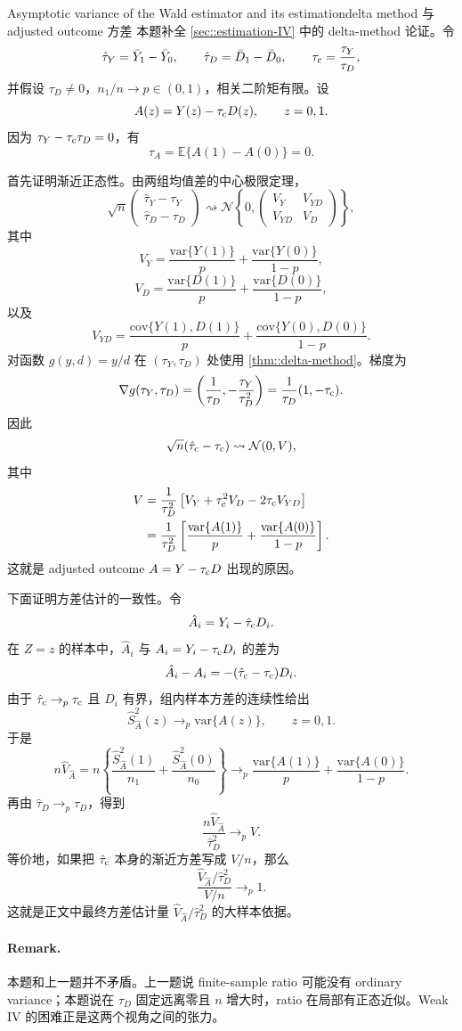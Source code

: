 \begin{exercisesolution}{Asymptotic variance of the Wald estimator and its estimation}{delta method 与 adjusted outcome 方差}
本题补全 \cref{sec::estimation-IV} 中的 delta-method 论证。令
\[
\hat{\tau}_Y=\bar{Y}_1-\bar{Y}_0,\qquad
\hat{\tau}_D=\bar{D}_1-\bar{D}_0,\qquad
\tau_{\textup{c}}=\frac{\tau_Y}{\tau_D},
\]
并假设 $\tau_D\neq 0$，$n_1/n\to p\in(0,1)$，相关二阶矩有限。设
\[
A(z)=Y(z)-\tau_{\textup{c}} D(z),\qquad z=0,1.
\]
因为 $\tau_Y-\tau_{\textup{c}}\tau_D=0$，有
\[
\tau_A
=
\mathbb{E}\{A(1)-A(0)\}
=0.
\]

首先证明渐近正态性。由两组均值差的中心极限定理，
\[
\sqrt{n}
\begin{pmatrix}
\hat{\tau}_Y-\tau_Y\\
\hat{\tau}_D-\tau_D
\end{pmatrix}
\rightsquigarrow
\mathcal{N}\left\{
0,
\begin{pmatrix}
V_Y & V_{YD}\\
V_{YD} & V_D
\end{pmatrix}
\right\},
\]
其中
\[
V_Y=\frac{\text{var}\{Y(1)\}}{p}
+\frac{\text{var}\{Y(0)\}}{1-p},
\]
\[
V_D=\frac{\text{var}\{D(1)\}}{p}
+\frac{\text{var}\{D(0)\}}{1-p},
\]
以及
\[
V_{YD}
=
\frac{\text{cov}\{Y(1),D(1)\}}{p}
+\frac{\text{cov}\{Y(0),D(0)\}}{1-p}.
\]
对函数 $g(y,d)=y/d$ 在 $(\tau_Y,\tau_D)$ 处使用 \cref{thm::delta-method}。梯度为
\[
\nabla g(\tau_Y,\tau_D)
=
\left(\frac{1}{\tau_D},-\frac{\tau_Y}{\tau_D^2}\right)
=
\frac{1}{\tau_D}(1,-\tau_{\textup{c}}).
\]
因此
\[
\sqrt{n}(\hat{\tau}_{\textup{c}}-\tau_{\textup{c}})
\rightsquigarrow
\mathcal{N}(0,V),
\]
其中
\begin{align*}
V
&=
\frac{1}{\tau_D^2}
\left[
V_Y+\tau_{\textup{c}}^2V_D-2\tau_{\textup{c}} V_{YD}
\right]\\
&=
\frac{1}{\tau_D^2}
\left[
\frac{\text{var}\{A(1)\}}{p}
+\frac{\text{var}\{A(0)\}}{1-p}
\right].
\end{align*}
这就是 adjusted outcome $A=Y-\tau_{\textup{c}} D$ 出现的原因。

下面证明方差估计的一致性。令
\[
\hat{A}_i=Y_i-\hat{\tau}_{\textup{c}} D_i.
\]
在 $Z=z$ 的样本中，$\hat{A}_i$ 与 $A_i=Y_i-\tau_{\textup{c}} D_i$ 的差为
\[
\hat{A}_i-A_i=-(\hat{\tau}_{\textup{c}}-\tau_{\textup{c}})D_i.
\]
由于 $\hat{\tau}_{\textup{c}}\to_p\tau_{\textup{c}}$ 且 $D_i$ 有界，组内样本方差的连续性给出
\[
\hat{S}_{\hat A}^2(z)\to_p \text{var}\{A(z)\},
\qquad z=0,1.
\]
于是
\[
n\hat{V}_{\hat A}
=
n\left\{\frac{\hat{S}_{\hat A}^2(1)}{n_1}
+\frac{\hat{S}_{\hat A}^2(0)}{n_0}\right\}
\to_p
\frac{\text{var}\{A(1)\}}{p}
+\frac{\text{var}\{A(0)\}}{1-p}.
\]
再由 $\hat{\tau}_D\to_p\tau_D$，得到
\[
\frac{n\hat{V}_{\hat A}}{\hat{\tau}_D^2}
\to_p
V.
\]
等价地，如果把 $\hat{\tau}_{\textup{c}}$ 本身的渐近方差写成 $V/n$，那么
\[
\frac{\hat{V}_{\hat A}/\hat{\tau}_D^2}{V/n}\to_p 1.
\]
这就是正文中最终方差估计量 $\hat{V}_{\hat A}/\hat{\tau}_D^2$ 的大样本依据。

\paragraph{Remark.}
本题和上一题并不矛盾。上一题说 finite-sample ratio 可能没有 ordinary variance；本题说在 $\tau_D$ 固定远离零且 $n$ 增大时，ratio 在局部有正态近似。Weak IV 的困难正是这两个视角之间的张力。
\end{exercisesolution}

